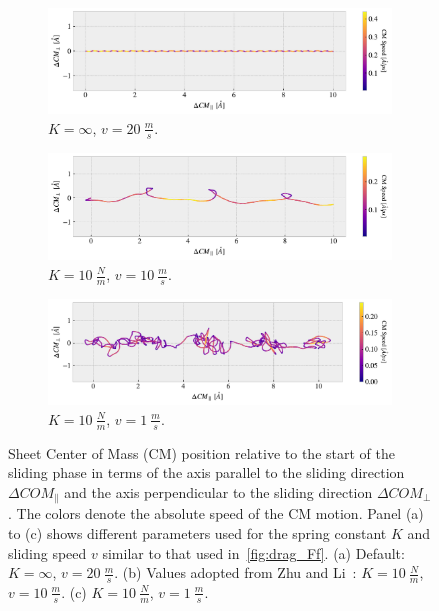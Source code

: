 \begin{figure}[!htb]
  \centering
  \begin{subfigure}[t]{0.85\textwidth}
    \centering
    \includegraphics[width=\textwidth]{figures/baseline/COM_path_K0.pdf}
    \caption{$K = \infty$, $v = \SI{20}{\frac{m}{s}}$.}
    \label{fig:CM_path_def}
  \end{subfigure}
  \hfill
  \begin{subfigure}[t]{0.85\textwidth}
    \centering
    \includegraphics[width=\textwidth]{figures/baseline/COM_path_K10_v10.pdf}
    \caption{$K = \SI{10}{\frac{N}{m}}$, $v = \SI{10}{\frac{m}{s}}$.}
    \label{fig:CM_path_K10_v10}
  \end{subfigure}
  \begin{subfigure}[t]{0.85\textwidth}
    \centering
    \includegraphics[width=\textwidth]{figures/baseline/COM_path_K10_v1.pdf}
    \caption{$K = \SI{10}{\frac{N}{m}}$, $v = \SI{1}{\frac{m}{s}}$.}
    \label{fig:CM_path_K10_v1}
  \end{subfigure}
  \caption{Sheet Center of Mass (\acrshort{CM}) position relative to the start of the sliding phase in terms of the axis parallel to the sliding direction $\Delta COM_{\parallel}$ and the axis perpendicular to the sliding direction $\Delta COM_{\perp}$. The colors denote the absolute speed of the \acrshort{CM} motion. Panel (a) to (c) shows different parameters used for the spring constant $K$ and sliding speed $v$ similar to that used in~\cref{fig:drag_Ff}. (a) Default: $K = \infty$, $v = \SI{20}{\frac{m}{s}}$. (b) Values adopted from Zhu
  and Li~\cite{zhu_study_2018}: $K = \SI{10}{\frac{N}{m}}$, $v = \SI{10}{\frac{m}{s}}$. (c) $K = \SI{10}{\frac{N}{m}}$, $v = \SI{1}{\frac{m}{s}}$.}
  \label{fig:CM_path}
\end{figure}


